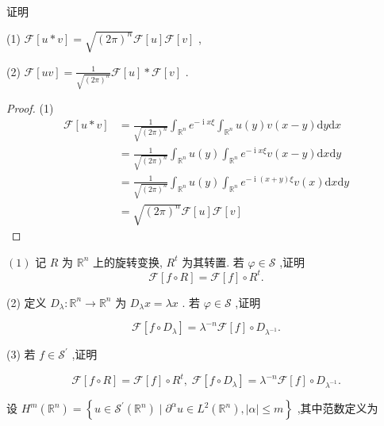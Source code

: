 \documentclass[lang=cn,newtx,10pt,scheme=chinese,thmcnt=chapter]{elegantbook}
\newcommand{\dif}{\mathrm{d}}
\newcommand{\ci}{\operatorname{i}}
\begin{document}
\begin{problemset}
证明

(1) \(\mathcal{F}\left\lbrack  {u * v}\right\rbrack   = \sqrt{{\left( 2\pi \right) }^{n}}\mathcal{F}\left\lbrack  u\right\rbrack  \mathcal{F}\left\lbrack  v\right\rbrack\) ,

(2) \(\mathcal{F}\left\lbrack  {uv}\right\rbrack   = \frac{1}{\sqrt{{\left( 2\pi \right) }^{n}}}\mathcal{F}\left\lbrack  u\right\rbrack   * \mathcal{F}\left\lbrack  v\right\rbrack\) .
\begin{proof}
    (1)\begin{equation*}
        \begin{aligned}
\mathcal{F}\left\lbrack  {u * v}\right\rbrack&=\frac{1}{\sqrt{(2\pi)^n}}\int_{\mathbb{R}^n }e^{-\ci x\xi}\int_{\mathbb{R}^n}u(y)v(x-y)\dif y\dif x  \\
&=\frac{1}{\sqrt{(2\pi)^n}}\int_{\mathbb{R}^n }u(y)\int_{\mathbb{R}^n}e^{-\ci x\xi}v(x-y)\dif x\dif y  \\
&=\frac{1}{\sqrt{(2\pi)^n}}\int_{\mathbb{R}^n }u(y)\int_{\mathbb{R}^n}e^{-\ci( x+y)\xi}v(x)\dif x\dif y  
\\
&= \sqrt{{\left( 2\pi \right) }^{n}}\mathcal{F}\left\lbrack  u\right\rbrack  \mathcal{F}\left\lbrack  v\right\rbrack\
        \end{aligned}
    \end{equation*}
\end{proof}
\item 
\(\left( 1\right)\) 记 \(R\) 为 \({\mathbb{R}}^{n}\) 上的旋转变换, \({R}^{t}\) 为其转置. 若 \(\varphi  \in  \mathcal{S}\) ,证明
\begin{equation*}
\mathcal{F}\left\lbrack  {f \circ  R}\right\rbrack   = \mathcal{F}\left\lbrack  f\right\rbrack   \circ  {R}^{t}.
\end{equation*}

(2) 定义 \({D}_{\lambda } : {\mathbb{R}}^{n} \rightarrow  {\mathbb{R}}^{n}\) 为 \({D}_{\lambda }x = {\lambda x}\) . 若 \(\varphi  \in  \mathcal{S}\) ,证明

\begin{equation*}
\mathcal{F}\left\lbrack  {f \circ  {D}_{\lambda }}\right\rbrack   = {\lambda }^{-n}\mathcal{F}\left\lbrack  f\right\rbrack   \circ  {D}_{{\lambda }^{-1}}.
\end{equation*}

(3) 若 \(f \in  {\mathcal{S}}^{\prime }\) ,证明

\begin{equation*}
\mathcal{F}\left\lbrack  {f \circ  R}\right\rbrack   = \mathcal{F}\left\lbrack  f\right\rbrack   \circ  {R}^{t},\;\mathcal{F}\left\lbrack  {f \circ  {D}_{\lambda }}\right\rbrack   = {\lambda }^{-n}\mathcal{F}\left\lbrack  f\right\rbrack   \circ  {D}_{{\lambda }^{-1}}.
\end{equation*}
\item 设 \({H}^{m}\left( {\mathbb{R}}^{n}\right)  = \left\{  {u \in  {\mathcal{S}}^{\prime }\left( {\mathbb{R}}^{n}\right)  \mid  {\partial }^{\alpha }u \in  {L}^{2}\left( {\mathbb{R}}^{n}\right) ,\left| \alpha \right|  \leqslant  m}\right\}\) ,其中范数定义为


\end{problemset}
\end{document}
